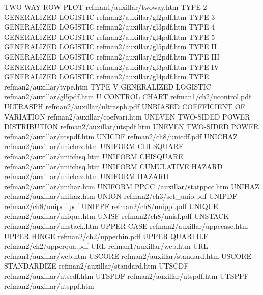 TWO WAY ROW PLOT                        refman1/auxillar/twoway.htm
TYPE 2 GENERALIZED LOGISTIC             refman2/auxillar/gl2pdf.htm
TYPE 3 GENERALIZED LOGISTIC             refman2/auxillar/gl3pdf.htm
TYPE 4 GENERALIZED LOGISTIC             refman2/auxillar/gl4pdf.htm
TYPE 5 GENERALIZED LOGISTIC             refman2/auxillar/gl5pdf.htm
TYPE II GENERALIZED LOGISTIC            refman2/auxillar/gl2pdf.htm
TYPE III GENERALIZED LOGISTIC           refman2/auxillar/gl3pdf.htm
TYPE IV GENERALIZED LOGISTIC            refman2/auxillar/gl4pdf.htm
TYPE                                    refman2/auxillar/type.htm
TYPE V GENERALIZED LOGISTIC             refman2/auxillar/gl5pdf.htm
U CONTROL CHART                         refman1/ch2/ucontrol.pdf
ULTRASPH                                refman2/auxillar/ultrasph.pdf
UNBIASED  COEFFICIENT OF VARIATION      refman2/auxillar/coefvari.htm
UNEVEN TWO-SIDED POWER DISTRIBUTION     refman2/auxillar/utspdf.htm
UNEVEN TWO-SIDED POWER                  refman2/auxillar/utspdf.htm
UNICDF                                  refman2/ch8/unicdf.pdf
UNICHAZ                                 refman2/auxillar/unichaz.htm
UNIFORM CHI-SQUARE                      refman2/auxillar/unifchsq.htm
UNIFORM CHISQUARE                       refman2/auxillar/unifchsq.htm
UNIFORM CUMULATIVE HAZARD               refman2/auxillar/unichaz.htm
UNIFORM HAZARD                          refman2/auxillar/unihaz.htm
UNIFORM PPCC                            /auxillar/statppcc.htm
UNIHAZ                                  refman2/auxillar/unihaz.htm
UNION                                   refman2/ch3/set_unio.pdf
UNIPDF                                  refman2/ch8/unipdf.pdf
UNIPPF                                  refman2/ch8/unippf.pdf
UNIQUE                                  refman2/auxillar/unique.htm
UNISF                                   refman2/ch8/unisf.pdf
UNSTACK                                 refman2/auxillar/unstack.htm
UPPER CASE                              refman2/auxillar/uppecase.htm
UPPER HINGE                             refman2/ch2/upperhin.pdf
UPPER QUARTILE                          refman2/ch2/upperqua.pdf
URL                                     refman1/auxillar/web.htm
URL                                     refman1/auxillar/web.htm
USCORE                                  refman2/auxillar/standard.htm
USCORE STANDARDIZE                      refman2/auxillar/standard.htm
UTSCDF                                  refman2/auxillar/utscdf.htm
UTSPDF                                  refman2/auxillar/utspdf.htm
UTSPPF                                  refman2/auxillar/utsppf.htm
